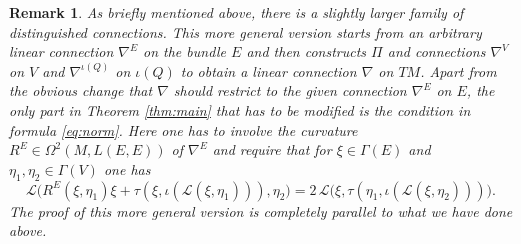 \documentclass[11pt]{amsart}
\newtheorem{remark}[proposition]{Remark}
\numberwithin{proposition}{section}
\numberwithin{equation}{section}
\begin{document}
\begin{remark}\label{rem:non-exact}
As briefly mentioned above, there is a slightly larger family of distinguished connections. This more general version starts from an arbitrary linear connection $\nabla^E$ on the bundle $E$ and then constructs $\Pi$ and connections $\nabla^V$ on $V$ and $\nabla^{\iota(Q)}$ on $\iota(Q)$ to obtain a linear connection $\nabla$ on $TM$. Apart from the obvious change that $\nabla$ should restrict to the given connection $\nabla^E$ on $E$, the only part in Theorem \ref{thm:main} that has to be modified is the condition in formula \eqref{eq:norm}. Here one has to involve the curvature $R^E\in\Omega^2(M,L(E,E))$ of $\nabla^E$ and require that for $\xi\in\Gamma(E)$ and $\eta_1,\eta_2\in\Gamma(V)$ one has
$$
\mathcal L\Big(R^E(\xi,\eta_1)\xi+
\tau(\xi,\iota(\mathcal L(\xi,\eta_1))),\eta_2\Big)=2\,\mathcal L\Big(\xi,\tau(\eta_1,\iota(\mathcal L(\xi,\eta_2)))\Big).
$$
The proof of this more general version is completely parallel to what we have done above. 
\end{remark}
\end{document}
